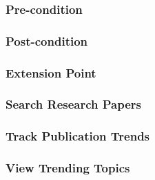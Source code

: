 \subsubsection{Pre-condition}

\subsubsection{Post-condition}

\subsubsection{Extension Point}
\subsubsection*{Search Research Papers}

\subsubsection*{Track Publication Trends}

\subsubsection*{View Trending Topics}

